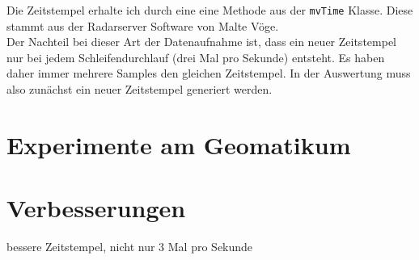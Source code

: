 \documentclass[12pt,a4paper]{scrartcl}
\begin{document}
Die Zeitstempel erhalte ich durch eine eine Methode aus der \texttt{mvTime} Klasse. Diese stammt aus der Radarserver Software von Malte Vöge. \\

Der Nachteil bei dieser Art der Datenaufnahme ist, dass ein neuer Zeitstempel nur bei jedem Schleifendurchlauf (drei Mal pro Sekunde) entsteht. Es haben daher immer mehrere Samples den gleichen Zeitstempel. In der Auswertung muss also zunächst ein neuer Zeitstempel generiert werden.

\section{Experimente am Geomatikum}



\section{Verbesserungen}

bessere Zeitstempel, nicht nur 3 Mal pro Sekunde

\clearpage
\newpage
\singlespacing
\appendix
% 


\end{document}
